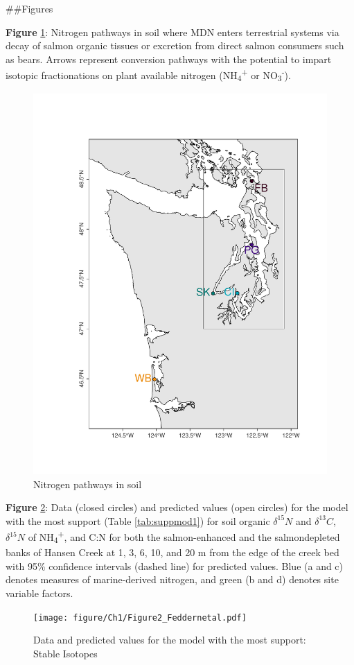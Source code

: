 \documentclass [11pt, proquest] {uwthesis}[2015/03/03]
\begin{document}
\#\#Figures

\textbf{Figure} \ref{fig:npathways}: Nitrogen pathways in soil where MDN enters terrestrial systems via decay of salmon organic tissues or excretion from direct salmon consumers such as bears. Arrows represent conversion pathways with the potential to impart isotopic fractionations on plant available nitrogen (NH\textsubscript{4}\textsuperscript{+} or NO\textsubscript{3}\textsuperscript{-}).\newline
\begin{figure}[h]
  \includegraphics{figure/Ch1/fig1.1.pdf}
  \caption{Nitrogen pathways in soil}
  \label{fig:npathways}
\end{figure}
\clearpage

\textbf{Figure} \ref{fig:modIsotope}: Data (closed circles) and predicted values (open circles) for the model with the most support (Table \ref{tab:suppmod1}) for soil organic \(\delta^{15}N\) and \(\delta^{13}C\), \(\delta^{15}N\) of NH\textsubscript{4}\textsuperscript{+}, and C:N for both the salmon-enhanced and the salmondepleted banks of Hansen Creek at 1, 3, 6, 10, and 20 m from the edge of the creek bed with 95\% confidence intervals (dashed line) for predicted values. Blue (a and c) denotes measures of marine-derived nitrogen, and green (b and d) denotes site variable factors.\newline
\begin{figure}[h]
  \texttt{[image: figure/Ch1/Figure2\_Feddernetal.pdf]}
  \caption{Data and predicted values for the model with the most support: Stable Isotopes}
  \label{fig:modIsotope}
\end{figure}
\clearpage
\end{document}
